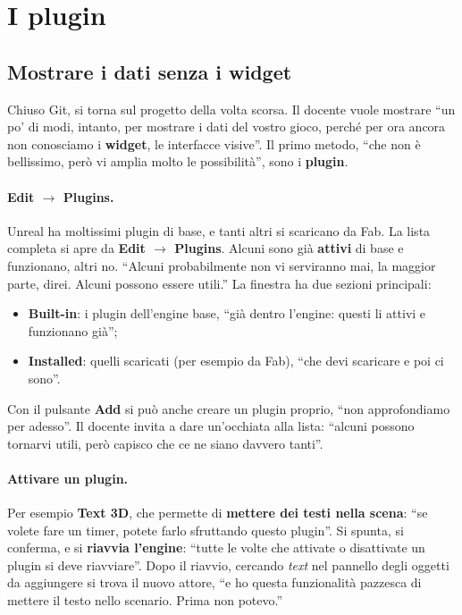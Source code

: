 \section{I plugin}
\label{gd13:sec:plugin}

\subsection{Mostrare i dati senza i widget}

Chiuso Git, si torna sul progetto della volta scorsa. Il docente vuole mostrare
``un po' di modi, intanto, per mostrare i dati del vostro gioco, perché per ora
ancora non conosciamo i \textbf{widget}, le interfacce visive''. Il primo metodo,
``che non è bellissimo, però vi amplia molto le possibilità'', sono i
\textbf{plugin}.

\paragraph{Edit $\rightarrow$ Plugins.} Unreal ha moltissimi plugin di base, e
tanti altri si scaricano da Fab. La lista completa si apre da \textbf{Edit
$\rightarrow$ Plugins}. Alcuni sono già \textbf{attivi} di base e funzionano,
altri no. ``Alcuni probabilmente non vi serviranno mai, la maggior parte, direi.
Alcuni possono essere utili.'' La finestra ha due sezioni principali:
\begin{itemize}
  \item \textbf{Built-in}: i plugin dell'engine base, ``già dentro l'engine:
        questi li attivi e funzionano già'';
  \item \textbf{Installed}: quelli scaricati (per esempio da Fab), ``che devi
        scaricare e poi ci sono''.
\end{itemize}
Con il pulsante \textbf{Add} si può anche creare un plugin proprio, ``non
approfondiamo per adesso''. Il docente invita a dare un'occhiata alla lista:
``alcuni possono tornarvi utili, però capisco che ce ne siano davvero tanti''.

\paragraph{Attivare un plugin.} Per esempio \textbf{Text 3D}, che permette di
\textbf{mettere dei testi nella scena}: ``se volete fare un timer, potete farlo
sfruttando questo plugin''. Si spunta, si conferma, e si \textbf{riavvia
l'engine}: ``tutte le volte che attivate o disattivate un plugin si deve
riavviare''. Dopo il riavvio, cercando \emph{text} nel pannello degli oggetti da
aggiungere si trova il nuovo attore, ``e ho questa funzionalità pazzesca di
mettere il testo nello scenario. Prima non potevo.''

